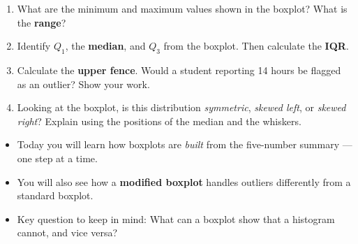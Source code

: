 \documentclass[10pt]{article}
\begin{document}
\begin{enumerate}[leftmargin=1.5em, itemsep=8pt]

  \item What are the minimum and maximum values shown in the boxplot?
        What is the \textbf{range}?\\[4pt]

  \item Identify $Q_1$, the \textbf{median}, and $Q_3$ from the boxplot.
        Then calculate the \textbf{IQR}.\\[4pt]

  \item Calculate the \textbf{upper fence}. Would a student reporting 14 hours
        be flagged as an outlier? Show your work.\\[4pt]

  \item Looking at the boxplot, is this distribution \textit{symmetric},
        \textit{skewed left}, or \textit{skewed right}? Explain using the
        positions of the median and the whiskers.\\[4pt]

\end{enumerate}

\vspace{0.14in}

\begin{tcolorbox}[colback=greenbg, colframe=greenacc, boxrule=0.8pt, arc=2mm,
    left=4mm, right=4mm, top=3mm, bottom=3mm]
\small
\begin{itemize}[leftmargin=1.3em, itemsep=5pt]
  \item Today you will learn how boxplots are \textit{built} from the five-number
        summary --- one step at a time.
  \item You will also see how a \textbf{modified boxplot} handles outliers
        differently from a standard boxplot.
  \item Key question to keep in mind: What can a boxplot show that a histogram
        cannot, and vice versa?
\end{itemize}
\end{tcolorbox}
\end{document}
